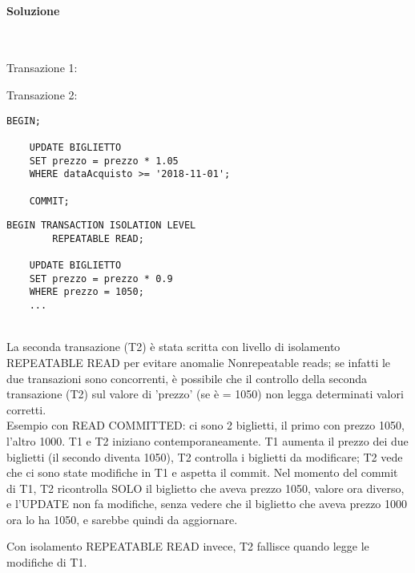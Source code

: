 \documentclass[a4paper, 10pt, titlepage]{article}
\begin{document}
\paragraph{Soluzione}\dotfill 
\\ \lstset{language=SQL}
\begin{minipage}{0.5\textwidth}
 Transazione 1:
\end{minipage}
\begin{minipage}{0.5\textwidth}
Transazione 2:
\end{minipage}
\begin{footnotesize}
\begin{minipage}{0.5\textwidth}
\begin{lstlisting}[tabsize=2]
	BEGIN;

	UPDATE BIGLIETTO 
	SET prezzo = prezzo * 1.05
	WHERE dataAcquisto >= '2018-11-01';
	
	COMMIT;
\end{lstlisting}
\end{minipage}\vrule\hfill
\begin{minipage}{0.5\textwidth}
\begin{lstlisting}[tabsize=2]
	BEGIN TRANSACTION ISOLATION LEVEL 
		REPEATABLE READ;

	UPDATE BIGLIETTO 
	SET prezzo = prezzo * 0.9
	WHERE prezzo = 1050;
	...
\end{lstlisting}
\end{minipage}
\end{footnotesize}\medskip \\
La seconda transazione (T2) è stata scritta con livello di isolamento REPEATABLE READ per evitare anomalie Nonrepeatable reads; se infatti le due transazioni sono concorrenti, è possibile che il controllo della seconda transazione (T2) sul valore di 'prezzo' (se è = 1050) non legga determinati valori corretti.\\
Esempio con READ COMMITTED: ci sono 2 biglietti, il primo con prezzo 1050, l'altro 1000. T1 e T2 iniziano contemporaneamente. 
T1 aumenta il prezzo dei due biglietti (il secondo diventa 1050), T2 controlla i biglietti da modificare; T2 vede che ci sono state modifiche in T1 e aspetta il commit. Nel momento del commit di T1, T2 ricontrolla SOLO il biglietto che aveva prezzo 1050, valore ora diverso, e l'UPDATE non fa modifiche, senza vedere che il biglietto che aveva prezzo 1000 ora lo ha 1050, e sarebbe quindi da aggiornare.

Con isolamento REPEATABLE READ invece, T2 fallisce quando legge le modifiche di T1.
\end{document}
